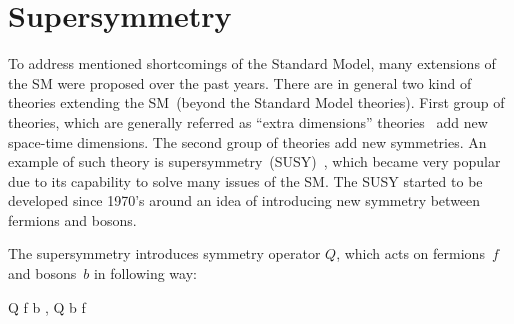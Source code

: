 




\section{Supersymmetry~\label{sec:SUSY}}

To address mentioned shortcomings of the Standard Model, many extensions of the SM were proposed over the past years. There are in general two kind of theories extending the SM~(beyond the Standard Model theories). First group of theories, which are generally referred as ``extra dimensions'' theories~\cite{Patrignani:2016xqp} add new space-time dimensions. The second group of theories add new symmetries. An example of such theory is supersymmetry~(SUSY)~\cite{Martin:1997ns}, which became very popular due to its capability to solve many issues of the SM. The SUSY started to be developed since 1970's around an idea of introducing new symmetry between fermions and bosons.
  

The supersymmetry introduces symmetry operator $Q$, which acts on fermions~$f$ and bosons~$b$ in following way:

{
Q \mid f \rangle \to \mid b \rangle \to  , \; Q \mid b \rangle \to \mid f \rangle
}

